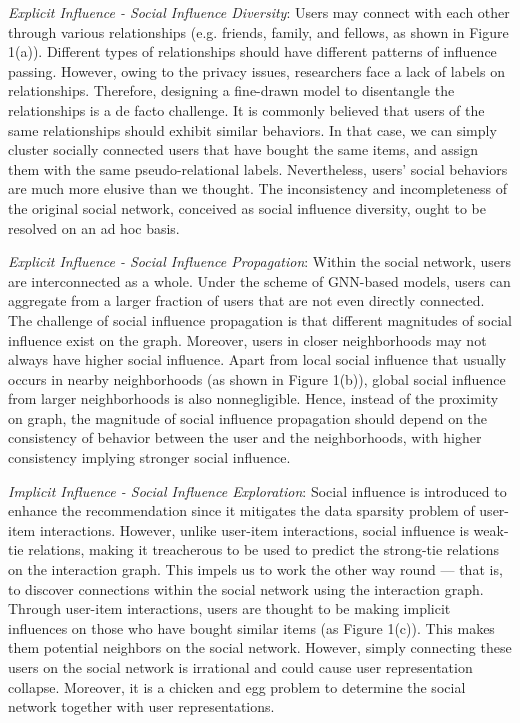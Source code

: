 \documentclass[letterpaper]{article} %
\begin{document}
\textit{Explicit Influence \uppercase\expandafter{} - Social Influence Diversity}: Users may connect with each other through various relationships (e.g. friends, family, and fellows, as shown in Figure 1(a)). Different types of relationships should have different patterns of influence passing. However, owing to the privacy issues, researchers face a lack of labels on relationships. Therefore, designing a fine-drawn model to disentangle the relationships is a de facto challenge. It is commonly believed that users of the same relationships should exhibit similar behaviors. In that case, we can simply cluster socially connected users that have bought the same items, and assign them with the same pseudo-relational labels. Nevertheless, users' social behaviors are much more elusive than we thought. The inconsistency and incompleteness of the original social network, conceived as social influence diversity, ought to be resolved on an ad hoc basis.

\textit{Explicit Influence \uppercase\expandafter{} - Social Influence Propagation}: Within the social network, users are interconnected as a whole. Under the scheme of GNN-based models, users can aggregate from a larger fraction of users that are not even directly connected. The challenge of social influence propagation is that different magnitudes of social influence exist on the graph. Moreover, users in closer neighborhoods may not always have higher social influence. Apart from local social influence that usually occurs in nearby neighborhoods (as shown in Figure 1(b)), global social influence from larger neighborhoods is also nonnegligible. Hence, instead of the proximity on graph, the magnitude of social influence propagation should depend on the consistency of behavior between the user and the neighborhoods, with higher consistency implying stronger social influence.

\textit{Implicit Influence - Social Influence Exploration}: Social influence is introduced to enhance the recommendation since it mitigates the data sparsity problem of user-item interactions. However, unlike user-item interactions, social influence is weak-tie relations, making it treacherous to be used to predict the strong-tie relations on the interaction graph. This impels us to work the other way round --- that is, to discover connections within the social network using the interaction graph. Through user-item interactions, users are thought to be making implicit influences on those who have bought similar items (as Figure 1(c)). This makes them potential neighbors on the social network. However, simply connecting these users on the social network is irrational and could cause user representation collapse. Moreover, it is a chicken and egg problem to determine the social network together with user representations.
\end{document}
